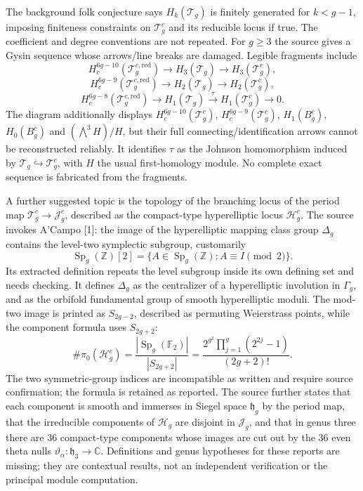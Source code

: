 \documentclass[11pt]{article}
\newcommand{\Z}{\mathbb{Z}}
\newcommand{\C}{\mathbb{C}}
\newcommand{\F}{\mathbb{F}}
\begin{document}
The background folk conjecture says \(H_k(\mathcal T_g)\) is finitely generated for \(k<g-1\), imposing finiteness constraints on \(\mathcal T_g^c\) and its reducible locus if true. The coefficient and degree conventions are not repeated. For \(g\geq3\) the source gives a Gysin sequence whose arrows/line breaks are damaged. Legible fragments include
\[H_c^{6g-10}(\mathcal T_g^{c,\mathrm{red}})\to H_3(\mathcal T_g)\to H_3(\mathcal T_g^c),\]
\[H_c^{6g-9}(\mathcal T_g^{c,\mathrm{red}})\to H_2(\mathcal T_g)\to H_2(\mathcal T_g^c),\]
\[H_c^{6g-8}(\mathcal T_g^{c,\mathrm{red}})\to H_1(\mathcal T_g)
\xrightarrow{\tau}H_1(\mathcal T_g^c)\to0.\]
The diagram additionally displays \(H_c^{6g-10}(\mathcal T_g^c)\), \(H_c^{6g-9}(\mathcal T_g^c)\), \(H_1(B_g^c)\), \(H_0(B_g^c)\) and \((\bigwedge^3 H)/H\), but their full connecting/identification arrows cannot be reconstructed reliably. It identifies \(\tau\) as the Johnson homomorphism induced by \(\mathcal T_g\hookrightarrow\mathcal T_g^c\), with \(H\) the usual first-homology module. No complete exact sequence is fabricated from the fragments.

A further suggested topic is the topology of the branching locus of the period map \(\mathcal T_g^c\to\mathcal J_g^c\), described as the compact-type hyperelliptic locus \(\mathcal H_g^c\). The source invokes A'Campo [1]: the image of the hyperelliptic mapping class group \(\Delta_g\) contains the level-two symplectic subgroup, customarily
\[\operatorname{Sp}_g(\Z)[2]=\{A\in\operatorname{Sp}_g(\Z):A\equiv I\pmod2\}.\]
Its extracted definition repeats the level subgroup inside its own defining set and needs checking. It defines \(\Delta_g\) as the centralizer of a hyperelliptic involution in \(\Gamma_g\), and as the orbifold fundamental group of smooth hyperelliptic moduli. The mod-two image is printed as \(S_{2g-2}\), described as permuting Weierstrass points, while the component formula uses \(S_{2g+2}\):
\[\#\pi_0(\mathcal H_g^c)=\frac{|\operatorname{Sp}_g(\F_2)|}{|S_{2g+2}|}
=\frac{2^{g^2}\prod_{j=1}^{g}(2^{2j}-1)}{(2g+2)!}.\]
The two symmetric-group indices are incompatible as written and require source confirmation; the formula is retained as reported. The source further states that each component is smooth and immerses in Siegel space \(\mathfrak h_g\) by the period map, that the irreducible components of \(\mathcal H_g\) are disjoint in \(\mathcal J_g\), and that in genus three there are \(36\) compact-type components whose images are cut out by the \(36\) even theta nulls \(\vartheta_\alpha:\mathfrak h_3\to\C\). Definitions and genus hypotheses for these reports are missing; they are contextual results, not an independent verification or the principal module computation.
\end{document}
